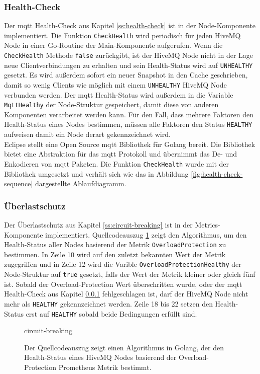 \newpage
\subsubsection{Health-Check} \label{si:health-check}
Der \ac{mqtt} Health-Check aus Kapitel \ref{ss:health-check} ist in der Node-Komponente implementiert. Die Funktion \verb|CheckHealth| wird periodisch für jeden HiveMQ Node in einer Go-Routine der Main-Komponente aufgerufen. Wenn die \verb|CheckHealth| Methode \verb|false| zurückgibt, ist der HiveMQ Node nicht in der Lage neue Clientverbindungen zu erhalten und sein Health-Status wird auf \verb|UNHEALTHY| gesetzt. Es wird au{\ss}erdem sofort ein neuer Snapshot in den Cache geschrieben, damit so wenig Clients wie möglich mit einem \verb|UNHEALTHY| HiveMQ Node verbunden werden. Der \ac{mqtt} Health-Status wird au{\ss}erdem in die Variable \verb|MqttHealthy| der Node-Struktur gespeichert, damit diese von anderen Komponenten verarbeitet werden kann. Für den Fall, dass mehrere Faktoren den Health-Status eines Nodes bestimmen, müssen alle Faktoren den Status \verb|HEALTHY| aufweisen damit ein Node derart gekennzeichnet wird.
\\
Eclipse stellt eine Open Source \ac{mqtt} Bibliothek für Golang bereit.
\cite{EclipsePahoMqtt2021}
Die Bibliothek bietet eine Abstraktion für das \ac{mqtt} Protokoll und übernimmt das De- und Enkodieren von \ac{mqtt} Paketen. Die Funktion \verb|CheckHealth| wurde mit der Bibliothek umgesetzt und verhält sich wie das in Abbildung \ref{fig:health-check-sequence} dargestellte Ablaufdiagramm.

\subsubsection{Überlastschutz}
Der Überlastschutz aus Kapitel \ref{ss:circuit-breaking} ist in der Metrics-Komponente implementiert. Quellcodeauszug \ref{code:circuit-breaking} zeigt den Algorithmus, um den Health-Status aller Nodes basierend der Metrik \verb|OverloadProtection| zu bestimmen. In Zeile 10 wird auf den zuletzt bekannten Wert der Metrik zugegriffen und in Zeile 12 wird die Varible \verb|OverloadProtectionHealthy| der Node-Struktur auf \verb|true| gesetzt, falls der Wert der Metrik kleiner oder gleich fünf ist.
Sobald der Overload-Protection Wert überschritten wurde, oder der \ac{mqtt} Health-Check aus Kapitel \ref{si:health-check} fehlgeschlagen ist, darf der HiveMQ Node nicht mehr als \verb|HEALTHY| gekennzeichnet werden. Zeile 18 bis 22 setzen den Health-Status erst auf \verb|HEALTHY| sobald beide Bedingungen erfüllt sind.
\begin{figure}
    {circuit-breaking}
    \caption{Der Quellcodeauszug zeigt einen Algorithmus in Golang, der den Health-Status eines HiveMQ Nodes basierend der Overload-Protection Prometheus Metrik bestimmt.}
    \label{code:circuit-breaking}
\end{figure}
\newpage

